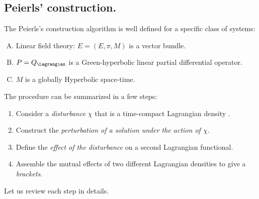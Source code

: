 \documentclass[Main]{subfiles}
\begin{document}
	\subsection{Peierls' construction.}
	The Peierls's construction algorithm is well defined for a specific class of systems:
		\begin{enumerate}[(A)]
			\item\label{HpPeierls1} Linear field theory: $E=(E,\pi,M)$ is a vector bundle.
			\item\label{HpPeierls2} $P=Q_\Lagrangian$ is a Green-hyperbolic linear partial differential operator.
			\item\label{HpPeierls3} $M$ is a globally Hyperbolic space-time.
		\end{enumerate}	
	The procedure can be summarized in a few steps:
	\begin{enumerate}
		\item Consider a \emph{disturbance} $\chi$ that is a time-compact Lagrangian density .
		\item Construct the \emph{perturbation of a solution under the action of $\chi$}.
		\item Define the \emph{effect of the disturbance} on a second Lagrangian functional.
		\item Assemble the mutual effects of two different Lagrangian densities to give a \emph{brackets}.
	\end{enumerate}	
	Let us review each step in details.
	
\end{document}
